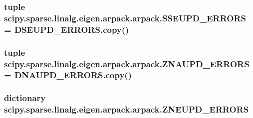 \subsubsection[{S\+S\+E\+U\+P\+D\+\_\+\+E\+R\+R\+O\+R\+S}]{\setlength{\rightskip}{0pt plus 5cm}tuple scipy.\+sparse.\+linalg.\+eigen.\+arpack.\+arpack.\+S\+S\+E\+U\+P\+D\+\_\+\+E\+R\+R\+O\+R\+S = D\+S\+E\+U\+P\+D\+\_\+\+E\+R\+R\+O\+R\+S.\+copy()}\label{namespacescipy_1_1sparse_1_1linalg_1_1eigen_1_1arpack_1_1arpack_ad51d2c04614436b983d9882ba17d00cb}
\hypertarget{namespacescipy_1_1sparse_1_1linalg_1_1eigen_1_1arpack_1_1arpack_ab93c60eb0f00c8d58982d9efe6a47054}{}
\subsubsection[{Z\+N\+A\+U\+P\+D\+\_\+\+E\+R\+R\+O\+R\+S}]{\setlength{\rightskip}{0pt plus 5cm}tuple scipy.\+sparse.\+linalg.\+eigen.\+arpack.\+arpack.\+Z\+N\+A\+U\+P\+D\+\_\+\+E\+R\+R\+O\+R\+S = D\+N\+A\+U\+P\+D\+\_\+\+E\+R\+R\+O\+R\+S.\+copy()}\label{namespacescipy_1_1sparse_1_1linalg_1_1eigen_1_1arpack_1_1arpack_ab93c60eb0f00c8d58982d9efe6a47054}
\hypertarget{namespacescipy_1_1sparse_1_1linalg_1_1eigen_1_1arpack_1_1arpack_ab1f8aa6c7a93f7f661b4bb4c9cb3afdf}{}
\subsubsection[{Z\+N\+E\+U\+P\+D\+\_\+\+E\+R\+R\+O\+R\+S}]{\setlength{\rightskip}{0pt plus 5cm}dictionary scipy.\+sparse.\+linalg.\+eigen.\+arpack.\+arpack.\+Z\+N\+E\+U\+P\+D\+\_\+\+E\+R\+R\+O\+R\+S}\label{namespacescipy_1_1sparse_1_1linalg_1_1eigen_1_1arpack_1_1arpack_ab1f8aa6c7a93f7f661b4bb4c9cb3afdf}
